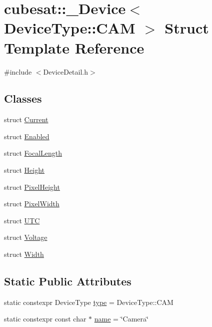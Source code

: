 \hypertarget{structcubesat_1_1__Device_3_01DeviceType_1_1CAM_01_4}{}\section{cubesat\+:\+:\+\_\+\+Device$<$ Device\+Type\+:\+:C\+AM $>$ Struct Template Reference}
\label{structcubesat_1_1__Device_3_01DeviceType_1_1CAM_01_4}


{\ttfamily \#include $<$Device\+Detail.\+h$>$}

\subsection*{Classes}
\begin{DoxyCompactItemize}
\item 
struct \hyperlink{structcubesat_1_1__Device_3_01DeviceType_1_1CAM_01_4_1_1Current}{Current}
\item 
struct \hyperlink{structcubesat_1_1__Device_3_01DeviceType_1_1CAM_01_4_1_1Enabled}{Enabled}
\item 
struct \hyperlink{structcubesat_1_1__Device_3_01DeviceType_1_1CAM_01_4_1_1FocalLength}{Focal\+Length}
\item 
struct \hyperlink{structcubesat_1_1__Device_3_01DeviceType_1_1CAM_01_4_1_1Height}{Height}
\item 
struct \hyperlink{structcubesat_1_1__Device_3_01DeviceType_1_1CAM_01_4_1_1PixelHeight}{Pixel\+Height}
\item 
struct \hyperlink{structcubesat_1_1__Device_3_01DeviceType_1_1CAM_01_4_1_1PixelWidth}{Pixel\+Width}
\item 
struct \hyperlink{structcubesat_1_1__Device_3_01DeviceType_1_1CAM_01_4_1_1UTC}{U\+TC}
\item 
struct \hyperlink{structcubesat_1_1__Device_3_01DeviceType_1_1CAM_01_4_1_1Voltage}{Voltage}
\item 
struct \hyperlink{structcubesat_1_1__Device_3_01DeviceType_1_1CAM_01_4_1_1Width}{Width}
\end{DoxyCompactItemize}
\subsection*{Static Public Attributes}
\begin{DoxyCompactItemize}
\item 
static constexpr Device\+Type \hyperlink{structcubesat_1_1__Device_3_01DeviceType_1_1CAM_01_4_a7b5fe0fa68ade4878d463f882d69c1ac}{type} = Device\+Type\+::\+C\+AM
\item 
static constexpr const char $\ast$ \hyperlink{structcubesat_1_1__Device_3_01DeviceType_1_1CAM_01_4_a3e38ddec6f8edd02aa2ff5953134a692}{name} = \char`\"{}Camera\char`\"{}
\end{DoxyCompactItemize}


